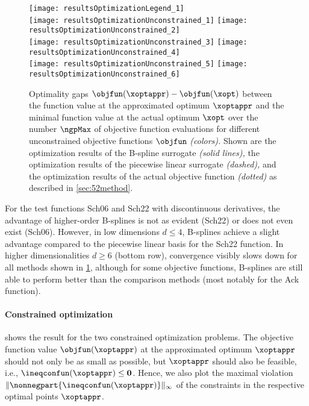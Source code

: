 \begin{figure}
  \texttt{[image: resultsOptimizationLegend\_1]}\\[2mm]%
  \texttt{[image: resultsOptimizationUnconstrained\_1]}%
  \hfill%
  \texttt{[image: resultsOptimizationUnconstrained\_2]}%
  \\[2mm]%
  \texttt{[image: resultsOptimizationUnconstrained\_3]}%
  \hfill%
  \texttt{[image: resultsOptimizationUnconstrained\_4]}%
  \\[2mm]%
  \texttt{[image: resultsOptimizationUnconstrained\_5]}%
  \hfill%
  \texttt{[image: resultsOptimizationUnconstrained\_6]}%
  \caption[Optimality gaps for different objective functions (unconstrained)]{%
    Optimality gaps $\objfun(\xoptappr) - \objfun(\xopt)$ between
    the function value at the approximated optimum $\xoptappr$ and
    the minimal function value at the actual optimum $\xopt$
    over the number $\ngpMax$ of objective function evaluations
    for different unconstrained
    objective functions $\objfun$ \emph{(colors).}
    Shown are the optimization results of the B-spline surrogate
    \emph{(solid lines),}
    the optimization results of the piecewise linear surrogate
    \emph{(dashed),} and
    the optimization results of the actual objective function
    \emph{(dotted)} as described in \cref{sec:52method}.%
  }%
  \label{fig:resultsOptimizationUnconstrainedTestFunctions}%
\end{figure}

For the test functions Sch06 and Sch22 with discontinuous derivatives,
the advantage of higher-order B-splines is not as evident (Sch22) or
does not even exist (Sch06).
However, in low dimensions $d \le 4$, B-splines
achieve a slight advantage compared to the piecewise linear basis
for the Sch22 function.
In higher dimensionalities $d \ge 6$ (bottom row),
convergence visibly slows down for all methods shown in
\cref{fig:resultsOptimizationUnconstrainedTestFunctions},
although for some objective functions, B-splines are still able
to perform better than the comparison methods
(most notably for the Ack function).

\paragraph{Constrained optimization}

shows the result for the two constrained optimization problems.
The objective function value $\objfun(\xoptappr)$
at the approximated optimum $\xoptappr$ should not only
be as small as possible, but $\xoptappr$ should also be feasible, i.e.,
$\ineqconfun(\xoptappr) \le \*0$.
Hence, we also plot the maximal violation
$\norm[\infty]{\nonnegpart{\ineqconfun(\xoptappr)}}$
of the constraints in the respective optimal points $\xoptappr$.


